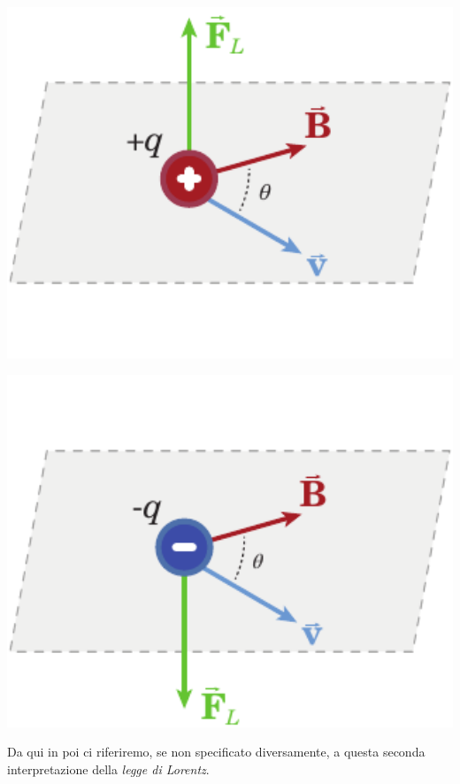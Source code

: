 \begin{center}
	\begin{minipage}{0.49\textwidth}
		\begin{center}
			\includegraphics[width=1\textwidth]{images/chp7/chp7forzalorentz1.pdf}
		\end{center}
	\end{minipage}
	\begin{minipage}{0.49\textwidth}
		\begin{center}
			\includegraphics[width=1\textwidth]{images/chp7/chp7forzalorentz2.pdf}
		\end{center}
	\end{minipage}
\end{center}
Da qui in poi ci riferiremo, se non specificato diversamente, a questa seconda interpretazione della \textit{legge di Lorentz}.
